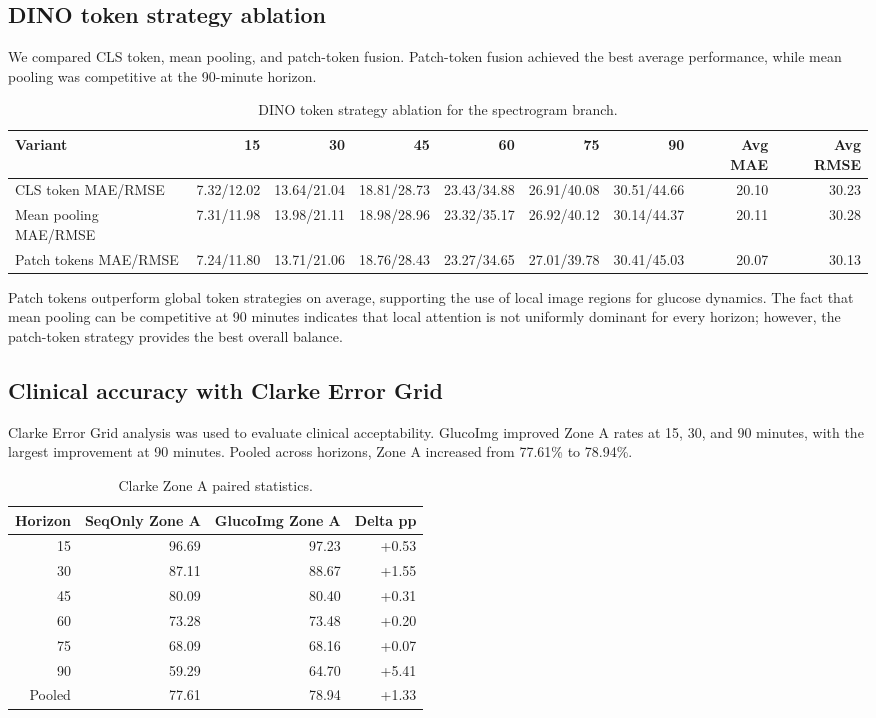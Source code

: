 \documentclass[11pt]{article}
\begin{document}
\subsection{DINO token strategy ablation}

We compared CLS token, mean pooling, and patch-token fusion. Patch-token fusion achieved the best average performance, while mean pooling was competitive at the 90-minute horizon.

\begin{table}[t]
\centering
\caption{DINO token strategy ablation for the spectrogram branch.}
\label{tab:token}
\small
\setlength{\tabcolsep}{2.8pt}
\begin{tabular}{lrrrrrrrr}
\toprule
Variant & 15 & 30 & 45 & 60 & 75 & 90 & Avg MAE & Avg RMSE \\
\midrule
CLS token MAE/RMSE & 7.32/12.02 & 13.64/21.04 & 18.81/28.73 & 23.43/34.88 & 26.91/40.08 & 30.51/44.66 & 20.10 & 30.23 \\
Mean pooling MAE/RMSE & 7.31/11.98 & 13.98/21.11 & 18.98/28.96 & 23.32/35.17 & 26.92/40.12 & 30.14/44.37 & 20.11 & 30.28 \\
Patch tokens MAE/RMSE & 7.24/11.80 & 13.71/21.06 & 18.76/28.43 & 23.27/34.65 & 27.01/39.78 & 30.41/45.03 & 20.07 & 30.13 \\
\bottomrule
\end{tabular}
\end{table}

Patch tokens outperform global token strategies on average, supporting the use of local image regions for glucose dynamics. The fact that mean pooling can be competitive at 90 minutes indicates that local attention is not uniformly dominant for every horizon; however, the patch-token strategy provides the best overall balance.

\subsection{Clinical accuracy with Clarke Error Grid}

Clarke Error Grid analysis was used to evaluate clinical acceptability. GlucoImg improved Zone A rates at 15, 30, and 90 minutes, with the largest improvement at 90 minutes. Pooled across horizons, Zone A increased from 77.61\% to 78.94\%.

\begin{table}[t]
\centering
\caption{Clarke Zone A paired statistics.}
\label{tab:clarke}
\small
\begin{tabular}{rrrr}
\toprule
Horizon & SeqOnly Zone A & GlucoImg Zone A & Delta pp \\
\midrule
15 & 96.69 & 97.23 & +0.53 \\
30 & 87.11 & 88.67 & +1.55 \\
45 & 80.09 & 80.40 & +0.31 \\
60 & 73.28 & 73.48 & +0.20 \\
75 & 68.09 & 68.16 & +0.07 \\
90 & 59.29 & 64.70 & +5.41 \\
Pooled & 77.61 & 78.94 & +1.33 \\
\bottomrule
\end{tabular}
\end{table}
\end{document}
